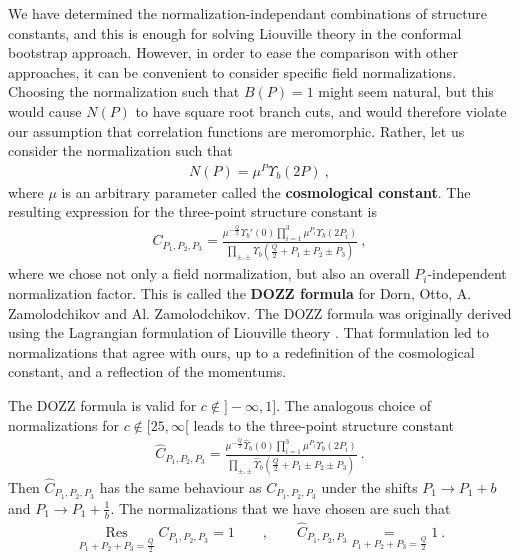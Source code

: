 \documentclass[12pt, a4paper, notitlepage, twoside]{report}
\numberwithin{equation}{section}
\theoremstyle{break}
\begin{document}
We have determined the normalization-independant combinations of structure constants, and this is enough for solving Liouville theory in the conformal bootstrap approach. However, in order to ease the comparison with other approaches, it can be convenient to consider specific field normalizations. 
Choosing the normalization such that $B(P)=1$ might seem natural, but this would cause $N(P)$ to have square root branch cuts, and would therefore violate our assumption that correlation functions are meromorphic. Rather, let us consider the normalization such that 
\begin{align}
 N(P) = \mu^{P}\Upsilon_b(2P)\ ,
 \label{nop}
\end{align}
where $\mu$ is an arbitrary parameter called the \textbf{\boldmath cosmological constant}.
The resulting expression for the three-point structure constant is
\begin{align}
 C_{P_1,P_2,P_3} =  \frac{\mu^{-\frac{Q}{2}}\Upsilon_b'(0)\prod_{i=1}^3 \mu^{P_i}\Upsilon_b(2P_i) }{\prod_{\pm,\pm} \Upsilon_b\left(\tfrac{Q}{2}+P_1\pm P_2 \pm P_3\right)} \ ,
\label{caaa}
\end{align}
where we chose not only a field normalization, but also an overall $P_i$-independent normalization factor. 
This is called the \textbf{\boldmath DOZZ formula} for Dorn, Otto, A.
Zamolodchikov and Al. Zamolodchikov. 
The DOZZ formula was originally derived using the Lagrangian formulation of Liouville theory \cite{zz95}. 
That formulation led to normalizations that agree with ours, 
up to a redefinition of the cosmological constant, and a reflection of the momentums. 

The DOZZ formula is valid for $c\notin ]-\infty, 1]$. The analogous choice of normalizations for $c\notin [25,\infty[$ leads to the three-point structure constant 
\begin{align}
 \hat C_{P_1,P_2,P_3} =  \frac{\mu^{-\frac{Q}{2}}\hat\Upsilon_b(0)\prod_{i=1}^3 \mu^{P_i}\hat\Upsilon_b(2P_i) }{\prod_{\pm,\pm} \hat\Upsilon_b\left(\tfrac{Q}{2}+P_1\pm P_2 \pm P_3\right)} \ .
\label{hc}
\end{align}
Then $\hat C_{P_1,P_2,P_3}$ has the same behaviour as $C_{P_1,P_2,P_3}$ under the shifts $P_1\to P_1+b$ and $P_1\to P_1+\frac{1}{b}$. The normalizations that we have chosen are such that
\begin{align}
 \underset{P_1+P_2+P_3=\frac{Q}{2}}{\operatorname{Res}} C_{P_1,P_2,P_3} = 1 \qquad , \qquad \hat C_{P_1,P_2,P_3}\underset{P_1+P_2+P_3=\frac{Q}{2}}{=} 1\ .
\label{chco}
 \end{align}
\end{document}
